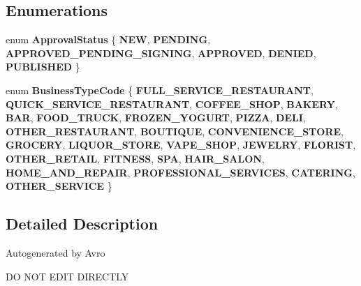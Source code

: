 \subsection*{Enumerations}
\begin{DoxyCompactItemize}
\item 
\mbox{\label{namespacecom_1_1clover_1_1sdk_1_1v3_1_1base___af5c362e084bbe6d747115b0e234f9fb9}} 
enum {\bfseries Approval\+Status} \{ \newline
{\bfseries N\+EW}, 
{\bfseries P\+E\+N\+D\+I\+NG}, 
{\bfseries A\+P\+P\+R\+O\+V\+E\+D\+\_\+\+P\+E\+N\+D\+I\+N\+G\+\_\+\+S\+I\+G\+N\+I\+NG}, 
{\bfseries A\+P\+P\+R\+O\+V\+ED}, 
\newline
{\bfseries D\+E\+N\+I\+ED}, 
{\bfseries P\+U\+B\+L\+I\+S\+H\+ED}
 \}
\item 
\mbox{\label{namespacecom_1_1clover_1_1sdk_1_1v3_1_1base___a650568214ff50530b67b37a45a6b04e2}} 
enum {\bfseries Business\+Type\+Code} \{ \newline
{\bfseries F\+U\+L\+L\+\_\+\+S\+E\+R\+V\+I\+C\+E\+\_\+\+R\+E\+S\+T\+A\+U\+R\+A\+NT}, 
{\bfseries Q\+U\+I\+C\+K\+\_\+\+S\+E\+R\+V\+I\+C\+E\+\_\+\+R\+E\+S\+T\+A\+U\+R\+A\+NT}, 
{\bfseries C\+O\+F\+F\+E\+E\+\_\+\+S\+H\+OP}, 
{\bfseries B\+A\+K\+E\+RY}, 
\newline
{\bfseries B\+AR}, 
{\bfseries F\+O\+O\+D\+\_\+\+T\+R\+U\+CK}, 
{\bfseries F\+R\+O\+Z\+E\+N\+\_\+\+Y\+O\+G\+U\+RT}, 
{\bfseries P\+I\+Z\+ZA}, 
\newline
{\bfseries D\+E\+LI}, 
{\bfseries O\+T\+H\+E\+R\+\_\+\+R\+E\+S\+T\+A\+U\+R\+A\+NT}, 
{\bfseries B\+O\+U\+T\+I\+Q\+UE}, 
{\bfseries C\+O\+N\+V\+E\+N\+I\+E\+N\+C\+E\+\_\+\+S\+T\+O\+RE}, 
\newline
{\bfseries G\+R\+O\+C\+E\+RY}, 
{\bfseries L\+I\+Q\+U\+O\+R\+\_\+\+S\+T\+O\+RE}, 
{\bfseries V\+A\+P\+E\+\_\+\+S\+H\+OP}, 
{\bfseries J\+E\+W\+E\+L\+RY}, 
\newline
{\bfseries F\+L\+O\+R\+I\+ST}, 
{\bfseries O\+T\+H\+E\+R\+\_\+\+R\+E\+T\+A\+IL}, 
{\bfseries F\+I\+T\+N\+E\+SS}, 
{\bfseries S\+PA}, 
\newline
{\bfseries H\+A\+I\+R\+\_\+\+S\+A\+L\+ON}, 
{\bfseries H\+O\+M\+E\+\_\+\+A\+N\+D\+\_\+\+R\+E\+P\+A\+IR}, 
{\bfseries P\+R\+O\+F\+E\+S\+S\+I\+O\+N\+A\+L\+\_\+\+S\+E\+R\+V\+I\+C\+ES}, 
{\bfseries C\+A\+T\+E\+R\+I\+NG}, 
\newline
{\bfseries O\+T\+H\+E\+R\+\_\+\+S\+E\+R\+V\+I\+CE}
 \}
\end{DoxyCompactItemize}


\subsection{Detailed Description}
Autogenerated by Avro

DO N\+OT E\+D\+IT D\+I\+R\+E\+C\+T\+LY 